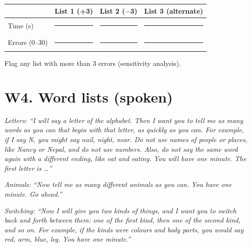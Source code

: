 \documentclass[10pt,a4paper]{article}
\newcommand{\blank}[1][1.2cm]{\rule{#1}{0.4pt}}
\begin{document}
\begin{tabular}{@{}lccc@{}}\toprule & List 1 (+3) & List 2 ($-$3) & List 3 (alternate)\\ \midrule
Time (s) & \blank & \blank & \blank \\ Errors (0--30) & \blank & \blank & \blank \\ \bottomrule\end{tabular}

Flag any list with more than 3 errors (sensitivity analysis).
\section*{W4. Word lists (spoken)}
\textit{Letters: ``I will say a letter of the alphabet. Then I want you to tell me as many words as you can that begin with that letter, as quickly as you can. For example, if I say N, you might say nail, night, near. Do not use names of people or places, like Nancy or Nepal, and do not use numbers. Also, do not say the same word again with a different ending, like eat and eating. You will have one minute. The first letter is \ldots''}

\textit{Animals: ``Now tell me as many different animals as you can. You have one minute. Go ahead.''}

\textit{Switching: ``Now I will give you two kinds of things, and I want you to switch back and forth between them: one of the first kind, then one of the second kind, and so on. For example, if the kinds were colours and body parts, you would say red, arm, blue, leg. You have one minute.''}
\end{document}
